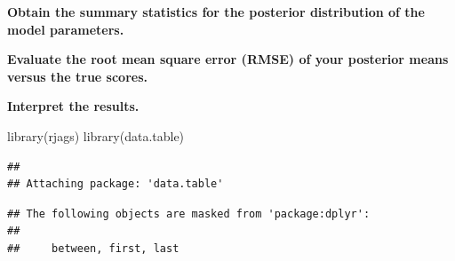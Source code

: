 \documentclass[
]{article}
\newenvironment{Shaded}{\begin{snugshade}}{\end{snugshade}}
\newcommand{\FunctionTok}[1]{\textcolor[rgb]{0.00,0.00,0.00}{#1}}
\newcommand{\NormalTok}[1]{#1}
\begin{document}
\textbf{Obtain the summary statistics for the posterior distribution of
the model parameters.}

\textbf{Evaluate the root mean square error (RMSE) of your posterior
means versus the true scores.}

\textbf{Interpret the results.}

\begin{Shaded}
\begin{Highlighting}[]
\FunctionTok{library}\NormalTok{(rjags)}
\FunctionTok{library}\NormalTok{(data.table)}
\end{Highlighting}
\end{Shaded}

\begin{verbatim}
## 
## Attaching package: 'data.table'
\end{verbatim}

\begin{verbatim}
## The following objects are masked from 'package:dplyr':
## 
##     between, first, last
\end{verbatim}
\end{document}
